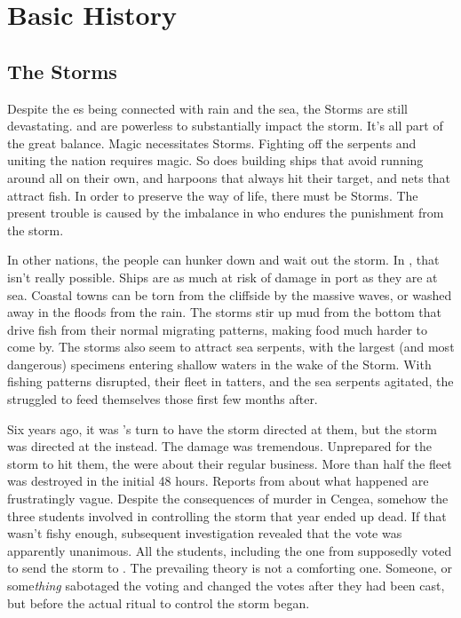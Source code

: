 \documentclass[blue]{GL2020}
\begin{document}
\name{\bVikings{}}

\section*{Basic History}


\subsection*{The Storms}
Despite the \pShip{} \cEbb{\God}es being connected with rain and the sea, the Storms are still devastating. \cEbb{} and \cFlow{} are powerless to substantially impact the storm. It's all part of the great balance. Magic necessitates Storms. Fighting off the serpents and uniting the \pShip{} nation requires magic. So does building ships that avoid running around all on their own, and harpoons that always hit their target, and nets that attract fish. In order to preserve the \pShip{} way of life, there must be Storms. The present trouble is caused by the imbalance in who endures the punishment from the storm.

In other nations, the people can hunker down and wait out the storm. In \pShip{}, that isn't really possible. Ships are as much at risk of damage in port as they are at sea. Coastal towns can be torn from the cliffside by the massive waves, or washed away in the floods from the rain. The storms stir up mud from the bottom that drive fish from their normal migrating patterns, making food much harder to come by. The storms also seem to attract sea serpents, with the largest (and most dangerous) specimens entering shallow waters in the wake of the Storm. With fishing patterns disrupted, their fleet in tatters, and the sea serpents agitated, the \pShip{} struggled to feed themselves those first few months after.

Six years ago, it was \pTech{}'s turn to have the storm directed at them, but the storm was directed at the \pShip{} instead. The damage was tremendous. Unprepared for the storm to hit them, the \pShippies{} were about their regular business. More than half the fleet was destroyed in the initial 48 hours. Reports from \pSchool{} about what happened are frustratingly vague. Despite the consequences of murder in Cengea, somehow the three students involved in controlling the storm that year ended up dead. If that wasn't fishy enough, subsequent investigation revealed that the vote was apparently unanimous. All the students, including the one from \pShip{} supposedly voted to send the storm to \pShip{}. The prevailing theory is not a comforting one. Someone, or some\emph{thing} sabotaged the voting and changed the votes after they had been cast, but before the actual ritual to control the storm began.
\end{document}

